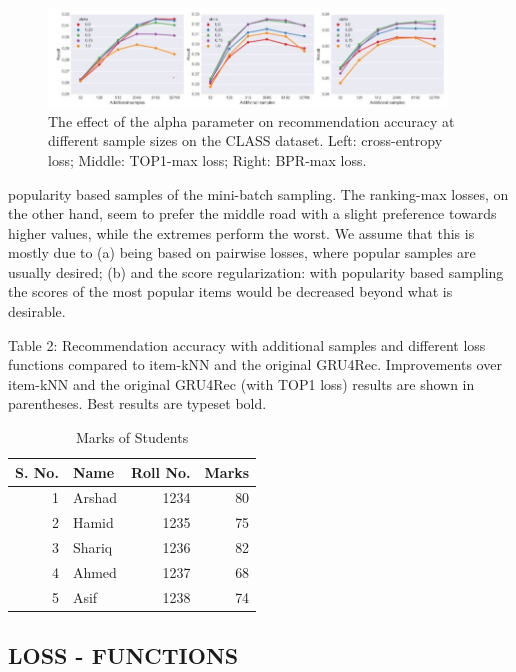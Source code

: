 \documentclass{article} %
\begin{document}
\begin{figure}[htp]
    \centering
    \includegraphics[width=400]{img/p4.JPG}
    \caption{The effect of the alpha parameter on recommendation accuracy at different sample sizes
on the CLASS dataset. Left: cross-entropy loss; Middle: TOP1-max loss; Right: BPR-max loss.}
    \label{fig:fig4}
\end{figure}

popularity based samples of the mini-batch sampling. The ranking-max losses, on the other hand, seem to prefer the middle road with a slight preference towards higher values, while the extremes perform the worst. We assume that this is mostly due to (a) being based on pairwise losses, where popular samples are usually desired; (b) and the score regularization: with popularity based sampling the scores of the most popular items would be decreased beyond what is desirable.

Table 2: Recommendation accuracy with additional samples and different loss functions compared to item-kNN and the original GRU4Rec. Improvements over item-kNN and the original GRU4Rec (with TOP1 loss) results are shown in parentheses. Best results are typeset bold.


\begin{table}[htbp]
  \centering
  \caption{Marks of Students}
    \begin{tabular}{|r|l|r|r|}
		\hline
    S. No. &Name& Roll No. &Marks \\
		\hline
    1     & Arshad & 1234  & 80 \\
    2     & Hamid & 1235  & 75 \\
    3     & Shariq & 1236  & 82 \\
    4     & Ahmed & 1237  & 68 \\
    5     & Asif  & 1238  & 74 \\
		\hline
		\hline
    \end{tabular}%
  \label{tab:addlabel}%
\end{table}%

\label{headings}


\subsection{LOSS - FUNCTIONS}
\end{document}

